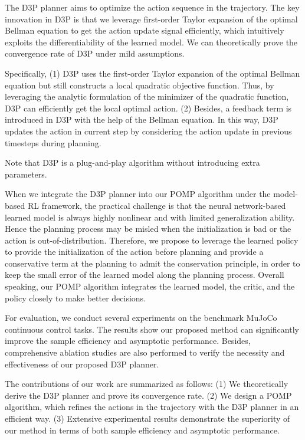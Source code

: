 \documentclass{article}
\begin{document}
The D3P planner aims to optimize the action sequence in the trajectory. The key innovation in D3P is that we leverage first-order Taylor expansion of the optimal Bellman equation to get the action update signal efficiently, which intuitively exploits the differentiability of the learned model. We can theoretically prove the convergence rate of D3P under mild assumptions. 

Specifically, (1) D3P uses the first-order Taylor expansion of the optimal Bellman equation but still constructs a local quadratic objective function. Thus, by leveraging the analytic formulation of the minimizer of the quadratic function, D3P can efficiently get the local optimal action. 
(2) Besides, a feedback term is introduced in D3P with the help of the Bellman equation. In this way, D3P updates the action in current step by considering the action update in previous timesteps during planning. 

Note that D3P is a plug-and-play algorithm without introducing extra parameters.

When we integrate the D3P planner into our POMP algorithm under the model-based RL framework, the practical challenge is that the neural network-based learned model is always highly nonlinear and with limited generalization ability. Hence the planning process may be misled when the initialization is bad or the action is out-of-distribution. 
Therefore, we propose to leverage the learned policy to provide the initialization of the action before planning and provide a conservative term at the planning to admit the conservation principle, in order to keep the small error of the learned model along the planning process.
Overall speaking, our POMP algorithm integrates the learned model, the critic, and the policy closely to make better decisions. 

For evaluation, we conduct several experiments on the benchmark MuJoCo  continuous control tasks. The results show  our proposed method can significantly improve the sample efficiency  and asymptotic performance. Besides, comprehensive ablation studies are also performed to verify the necessity and effectiveness of our proposed D3P planner.

The contributions of our work are summarized as follows:
(1) We theoretically derive the D3P planner and prove its convergence rate. 
(2) We design a POMP algorithm, which refines the actions in the trajectory with the D3P planner in an efficient way. 
(3) Extensive experimental results  demonstrate the superiority of our method in terms of both sample efficiency and asymptotic performance. 
\end{document}
